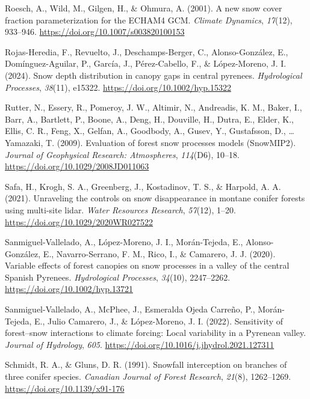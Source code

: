 \documentclass[
]{agujournal2019}
\newlength{\cslhangindent}
\newenvironment{CSLReferences}[2] %
 {\begin{list}{}{%
  \setlength{\itemindent}{0pt}
  \setlength{\leftmargin}{0pt}
  \setlength{\parsep}{0pt}
  \ifodd #1
   \setlength{\leftmargin}{\cslhangindent}
   \setlength{\itemindent}{-1\cslhangindent}
  \fi
  \setlength{\itemsep}{#2\baselineskip}}}
 {\end{list}}
\begin{document}
\begin{CSLReferences}{1}{0}
Roesch, A., Wild, M., Gilgen, H., \& Ohmura, A. (2001). A new snow cover
fraction parameterization for the {ECHAM4 GCM}. \emph{Climate Dynamics},
\emph{17}(12), 933--946. \url{https://doi.org/10.1007/s003820100153}

Rojas-Heredia, F., Revuelto, J., Deschamps-Berger, C., Alonso-González,
E., Domínguez-Aguilar, P., García, J., Pérez-Cabello, F., \&
López-Moreno, J. I. (2024). Snow depth distribution in canopy gaps in
central pyrenees. \emph{Hydrological Processes}, \emph{38}(11), e15322.
\url{https://doi.org/10.1002/hyp.15322}

Rutter, N., Essery, R., Pomeroy, J. W., Altimir, N., Andreadis, K. M.,
Baker, I., Barr, A., Bartlett, P., Boone, A., Deng, H., Douville, H.,
Dutra, E., Elder, K., Ellis, C. R., Feng, X., Gelfan, A., Goodbody, A.,
Gusev, Y., Gustafsson, D., \ldots{} Yamazaki, T. (2009). Evaluation of
forest snow processes models ({SnowMIP2}). \emph{Journal of Geophysical
Research: Atmospheres}, \emph{114}(D6), 10--18.
\url{https://doi.org/10.1029/2008JD011063}

Safa, H., Krogh, S. A., Greenberg, J., Kostadinov, T. S., \& Harpold, A.
A. (2021). Unraveling the controls on snow disappearance in montane
conifer forests using multi-site lidar. \emph{Water Resources Research},
\emph{57}(12), 1--20. \url{https://doi.org/10.1029/2020WR027522}

Sanmiguel-Vallelado, A., López-Moreno, J. I., Morán-Tejeda, E.,
Alonso-González, E., Navarro-Serrano, F. M., Rico, I., \& Camarero, J.
J. (2020). Variable effects of forest canopies on snow processes in a
valley of the central {Spanish Pyrenees}. \emph{Hydrological Processes},
\emph{34}(10), 2247--2262. \url{https://doi.org/10.1002/hyp.13721}

Sanmiguel-Vallelado, A., McPhee, J., Esmeralda Ojeda Carreño, P.,
Morán-Tejeda, E., Julio Camarero, J., \& López-Moreno, J. I. (2022).
Sensitivity of forest--snow interactions to climate forcing: {Local}
variability in a {Pyrenean} valley. \emph{Journal of Hydrology},
\emph{605}. \url{https://doi.org/10.1016/j.jhydrol.2021.127311}

Schmidt, R. A., \& Gluns, D. R. (1991). Snowfall interception on
branches of three conifer species. \emph{Canadian Journal of Forest
Research}, \emph{21}(8), 1262--1269.
\url{https://doi.org/10.1139/x91-176}


\end{CSLReferences}
\end{document}
